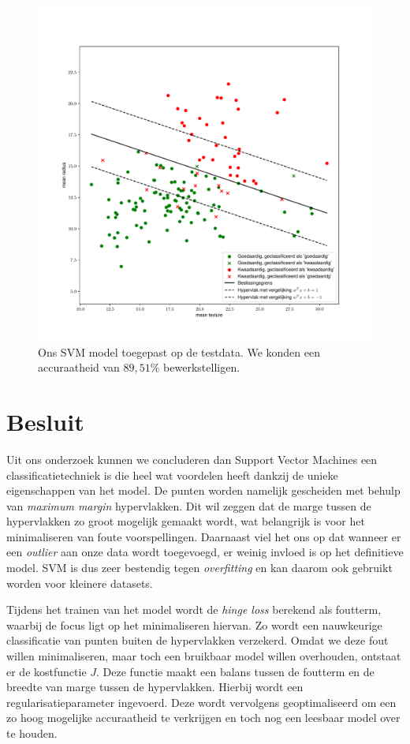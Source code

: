 \documentclass[twoside, kulak]{kulakreport}
\begin{document}
	\begin{figure}
		\centering
		\includegraphics[width=.9\textwidth]{testdata}
		\caption{Ons SVM model toegepast op de testdata. We konden een accuraatheid van \(89,51\%\) bewerkstelligen.}
		\label{fig:testdata}
	\end{figure}
	
	\chapter*{Besluit}
	
	Uit ons onderzoek kunnen we concluderen dan Support Vector Machines een classificatietechniek is die heel wat voordelen heeft dankzij de unieke eigenschappen van het model. De punten worden namelijk gescheiden met behulp van \textit{maximum margin} hypervlakken. Dit wil zeggen dat de marge tussen de hypervlakken zo groot mogelijk gemaakt wordt, wat belangrijk is voor het minimaliseren van foute voorspellingen. Daarnaast viel het ons op dat wanneer er een \textit{outlier} aan onze data wordt toegevoegd, er weinig invloed is op het definitieve model. SVM is dus zeer bestendig tegen \textit{overfitting} en kan daarom ook  gebruikt worden voor kleinere datasets.
	
	Tijdens het trainen van het model wordt de \textit{hinge loss} berekend als foutterm, waarbij de focus ligt op het minimaliseren hiervan. Zo wordt een nauwkeurige classificatie van punten buiten de hypervlakken verzekerd. Omdat we deze fout willen minimaliseren, maar toch een bruikbaar model willen overhouden, ontstaat er de kostfunctie \(J\). Deze functie maakt een balans tussen de foutterm en de breedte van marge tussen de hypervlakken. Hierbij wordt een regularisatieparameter ingevoerd. Deze wordt vervolgens geoptimaliseerd om een zo hoog mogelijke accuraatheid te verkrijgen en toch nog een leesbaar model over te houden.
	
\end{document}
